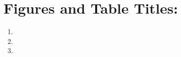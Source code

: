 \documentclass{article}
\begin{document}
\section*{Figures and Table Titles: }
\begin{enumerate}
\item
\item
\item
\end{enumerate}
\end{document}
